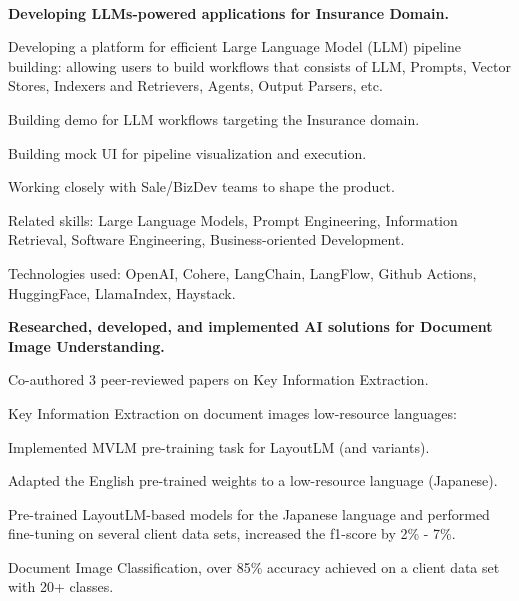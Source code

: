 \\
\begin{xitemize}
    \item \textbf{Developing LLMs-powered applications for Insurance Domain.}
    \begin{zitemize}
        \item Developing a platform for efficient Large Language Model (LLM) pipeline building: allowing
        users to build workflows that consists of LLM, Prompts, Vector Stores, Indexers and Retrievers,
        Agents, Output Parsers, etc.
        \item Building demo for LLM workflows targeting the Insurance domain.
        \item Building mock UI for pipeline visualization and execution.
        \item Working closely with Sale/BizDev teams to shape the product.
        \item Related skills: Large Language Models, Prompt Engineering, Information Retrieval, Software
        Engineering, Business-oriented Development.
        \item Technologies used: OpenAI, Cohere, LangChain, LangFlow, Github Actions, HuggingFace, LlamaIndex, Haystack.
    \end{zitemize}
    \item \textbf{Researched, developed, and implemented AI solutions for Document Image Understanding.}
    \begin{zitemize}
        \item Co-authored  3 peer-reviewed papers on Key Information Extraction.
        \item Key Information Extraction on document images low-resource languages:
        \begin{zitemize}
            \item Implemented MVLM pre-training task for LayoutLM (and variants).
            \item Adapted the English pre-trained weights to a low-resource language (Japanese).
            \item Pre-trained LayoutLM-based models for the Japanese language and performed fine-tuning on several client data sets, increased the f1-score by 2\% - 7\%.
        \end{zitemize}
        \item Document Image Classification, over 85\% accuracy achieved on a client data set with 20+ classes.

\end{zitemize}
\end{xitemize}
